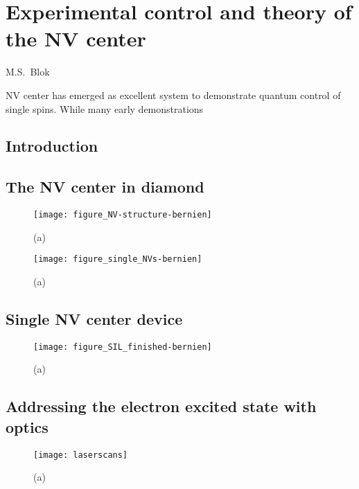 \graphicspath{{./ch_theory_and_methods/figures/}}


\chapter{Experimental control and theory of the NV center}
\label{ch:CDL}

\begin{center} 
    \vspace{-1cm} {M.S.~Blok} 
\end{center}


\vspace{-0.5cm} 
NV center has emerged as excellent system to demonstrate quantum control of single spins. While many early demonstrations

\clearpage

\section{Introduction}

\section{The NV center in diamond}
\begin{figure*}
	\centering
	\texttt{[image: figure\_NV-structure-bernien]}
	\caption{\label{fig:tam-fig1-nvstruct} \textbf{} (a) }
\end{figure*}

\begin{figure*}
	\centering
	\texttt{[image: figure\_single\_NVs-bernien]}
	\caption{\label{fig:tam-fig2-nvstruct} \textbf{} (a) }
\end{figure*}


\section{Single NV center device}
\begin{figure*}
	\centering
	\texttt{[image: figure\_SIL\_finished-bernien]}
	\caption{\label{fig:tam-fig3-device} \textbf{} (a) }
\end{figure*}

\section{Addressing the electron excited state with optics}
\begin{figure*}
	\centering
	\texttt{[image: laserscans]}
	\caption{\label{fig:tam-fig4-laserscan} \textbf{} (a) }
\end{figure*}

